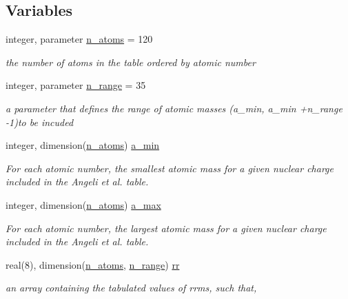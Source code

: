 \subsection*{Variables}
\begin{DoxyCompactItemize}
\item 
integer, parameter \mbox{\hyperlink{namespacenucleus__m_a97ff520812e294bf26a6b2c330f211e5}{n\+\_\+atoms}} = 120
\begin{DoxyCompactList}\small\item\em the number of atoms in the table ordered by atomic number \end{DoxyCompactList}\item 
integer, parameter \mbox{\hyperlink{namespacenucleus__m_adf953c9196f6870fe5e502b4f40bea48}{n\+\_\+range}} = 35
\begin{DoxyCompactList}\small\item\em a parameter that defines the range of atomic masses (a\+\_\+min, a\+\_\+min +n\+\_\+range -\/1)to be incuded \end{DoxyCompactList}\item 
integer, dimension(\mbox{\hyperlink{namespacenucleus__m_a97ff520812e294bf26a6b2c330f211e5}{n\+\_\+atoms}}) \mbox{\hyperlink{namespacenucleus__m_a8541e730d34d4c5cbb0ca885c9c5cc35}{a\+\_\+min}}
\begin{DoxyCompactList}\small\item\em For each atomic number, the smallest atomic mass for a given nuclear charge included in the Angeli et al. table. \end{DoxyCompactList}\item 
integer, dimension(\mbox{\hyperlink{namespacenucleus__m_a97ff520812e294bf26a6b2c330f211e5}{n\+\_\+atoms}}) \mbox{\hyperlink{namespacenucleus__m_ac8aa001386cf3938a2be5b5ec45d0c8d}{a\+\_\+max}}
\begin{DoxyCompactList}\small\item\em For each atomic number, the largest atomic mass for a given nuclear charge included in the Angeli et al. table. \end{DoxyCompactList}\item 
real(8), dimension(\mbox{\hyperlink{namespacenucleus__m_a97ff520812e294bf26a6b2c330f211e5}{n\+\_\+atoms}}, \mbox{\hyperlink{namespacenucleus__m_adf953c9196f6870fe5e502b4f40bea48}{n\+\_\+range}}) \mbox{\hyperlink{namespacenucleus__m_aadb2a0e0828722e6e3f118cdf1b07f50}{rr}}
\begin{DoxyCompactList}\small\item\em an array containing the tabulated values of rrms, such that, \end{DoxyCompactList}\end{DoxyCompactItemize}


